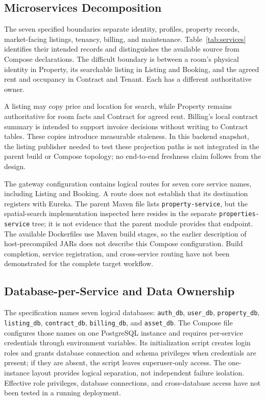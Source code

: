 \subsection{Microservices Decomposition}
The seven specified boundaries separate identity, profiles, property records, market-facing listings, tenancy, billing, and maintenance. Table~\ref{tab:services} identifies their intended records and distinguishes the available source from Compose declarations. The difficult boundary is between a room's physical identity in Property, its searchable listing in Listing and Booking, and the agreed rent and occupancy in Contract and Tenant. Each has a different authoritative owner.

A listing may copy price and location for search, while Property remains authoritative for room facts and Contract for agreed rent. Billing's local contract summary is intended to support invoice decisions without writing to Contract tables. These copies introduce measurable staleness. In this backend snapshot, the listing publisher needed to test these projection paths is not integrated in the parent build or Compose topology; no end-to-end freshness claim follows from the design.

The gateway configuration contains logical routes for seven core service names, including Listing and Booking. A route does not establish that its destination registers with Eureka. The parent Maven file lists \texttt{property-service}, but the spatial-search implementation inspected here resides in the separate \texttt{properties-service} tree; it is not evidence that the parent module provides that endpoint. The available Dockerfiles use Maven build stages, so the earlier description of host-precompiled JARs does not describe this Compose configuration. Build completion, service registration, and cross-service routing have not been demonstrated for the complete target workflow.

\subsection{Database-per-Service and Data Ownership}
The specification names seven logical databases: \texttt{auth\_db}, \texttt{user\_db}, \texttt{property\_db}, \texttt{listing\_db}, \texttt{contract\_db}, \texttt{billing\_db}, and \texttt{asset\_db}. The Compose file configures those names on one PostgreSQL instance and requires per-service credentials through environment variables. Its initialization script creates login roles and grants database connection and schema privileges when credentials are present; if they are absent, the script leaves superuser-only access. The one-instance layout provides logical separation, not independent failure isolation. Effective role privileges, database connections, and cross-database access have not been tested in a running deployment.

